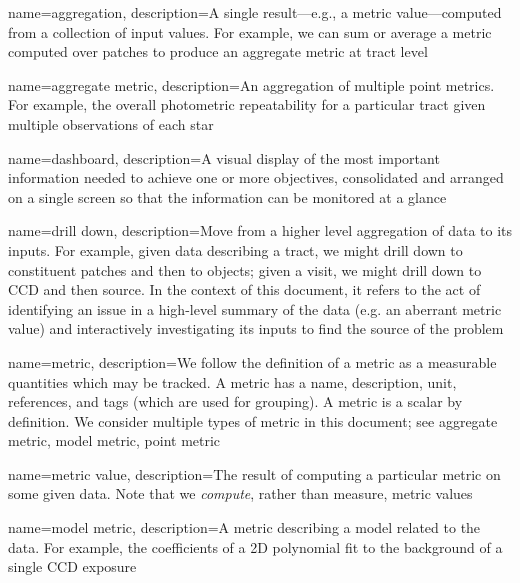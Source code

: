 %
%


%
%

{
  name={aggregation},
  description={A single result---e.g., a \gls{metric value}---computed from a
  collection of input values. For example, we can sum or average a
  \gls{metric} computed over patches to produce an \gls{aggregate metric} at
  tract level}
}

{
  name={aggregate metric},
  description={An \gls{aggregation} of multiple \glspl{point metric}. For
  example, the overall photometric repeatability for a particular tract given
  multiple observations of each star}
}

{
  name={dashboard},
  description={A visual display of the most important information needed to
  achieve one or more objectives, consolidated and arranged on a single screen
  so that the information can be monitored at a glance \citep{Few:2013}}
}

{
  name={drill down},
  description={Move from a higher level aggregation of data to its inputs. For
  example, given data describing a tract, we might drill down to constituent
  patches and then to objects; given a visit, we might drill down to CCD and
  then source. In the context of this document, it refers to the act of
  identifying an issue in a high-level summary of the data (e.g. an aberrant
  \gls{metric value}) and interactively investigating its inputs to find the
  source of the problem}
}

{
  name={metric},
  description={We follow the  definition of a metric as a
  measurable quantities which may be tracked. A metric has a name,
  description, unit, references, and tags (which are used for grouping). A
  metric is a scalar by definition. We consider multiple types of metric in
  this document; see \gls{aggregate metric}, \gls{model metric}, \gls{point
  metric}}
}

{
  name={metric value},
  description={The result of computing a particular \gls{metric} on some given
  data. Note that we \textit{compute}, rather than measure, metric values}
}

{
  name={model metric},
  description={A \gls{metric} describing a model related to the data. For
  example, the coefficients of a 2D polynomial fit to the background of a
  single CCD exposure}
}

